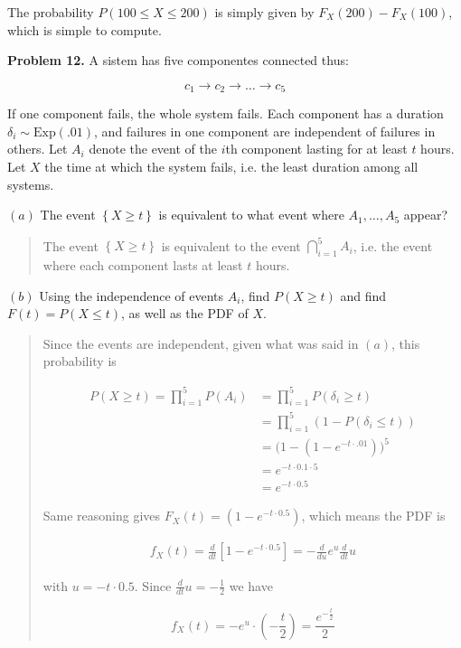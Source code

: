 \documentclass[a4paper, 12pt]{article}
\begin{document}
The probability $P(100 \leq X \leq 200)$ is simply given by $F_X(200) - F_X(100)$, which 
is simple to compute.

\textbf{Problem 12.} A sistem has five componentes connected thus:

\begin{equation*}
    c_1 \to c_2 \to  \ldots \to  c_5
\end{equation*}

If one component fails, the whole system fails. Each component has a duration
$\delta_i \sim \text{Exp}(.01)$, and failures in one component are independent
of failures in others. Let $A_i$ denote the event of the $i$th component 
lasting for at least $t$ hours. Let $X$ the time at which the system fails,
i.e. the least duration among all systems.

$(a)$ The event $\left\{ X \geq t \right\} $ is equivalent to what event 
where $A_1, \ldots, A_5$ appear?


\small
\begin{quote}

    The event $\left\{ X \geq t \right\} $ is equivalent to the event $\bigcap_{i=1}^{5} A_i$, i.e. 
    the event where each component lasts at least $t$ hours.

\end{quote}
\normalsize


$(b)$ Using the independence of events $A_i$, find $P(X \geq t)$ and find $F(t) = P(X \leq t)$, 
as well as the PDF of $X$.


\small
\begin{quote}

Since the events are independent, given what was said in $(a)$, this probability is 

\begin{align*}
    P(X \geq t) = \prod_{i=1}^{5} P(A_i) &= \prod_{i=1}^{5} P(\delta_i \geq t) \\ 
                           &= \prod_{i=1}^{5} \left( 1 - P(\delta_i \leq t) \right) \\
                           &= \Big( 1 - \left( 1 - e^{-t \cdot .01} \right) \Big)^{5} \\ 
                           &= e^{-t \cdot 0.1 \cdot 5}\\
                           &= e^{-t \cdot 0.5}
\end{align*}

Same reasoning gives $F_X(t) = (1 - e^{-t \cdot 0.5})$, which means the PDF is 

\begin{align*}
    f_X(t) = \frac{d}{dt} \left[ 1 - e^{-t \cdot 0.5} \right] = -\frac{d}{du} e^{u} \frac{d}{dt} u
\end{align*}

with $u = -t \cdot 0.5$. Since $\frac{d}{dt} u = -\frac{1}{2}$ we have 

\begin{equation*}
    f_X(t) = -e^u \cdot (- \frac{t}{2}) = \frac{e^{-\frac{t}{2}}}{2}
\end{equation*}

\end{quote}
\normalsize
\end{document}
